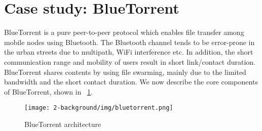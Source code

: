 
\section{Case study: BlueTorrent}
BlueTorrent \cite{bluetorrent} is a pure peer-to-peer protocol which enables file transfer among mobile nodes using Bluetooth. The Bluetooth channel tends to be error-prone in the urban streets due to multipath, WiFi interference etc. In addition, the short communication range and mobility of users result in short link/contact duration. BlueTorrent shares contents by using file swarming, mainly due to the limited bandwidth and the short contact duration. We now describe the core components of BlueTorrent, shown in \figurename~\ref{fig:bluetorrent}.

\begin{figure}[htpb]
  \begin{center}
    \texttt{[image: 2-background/img/bluetorrent.png]}
    \caption{BlueTorrent architecture \cite{bluetorrent}}    
    \label{fig:bluetorrent}
  \end{center}
\end{figure}

